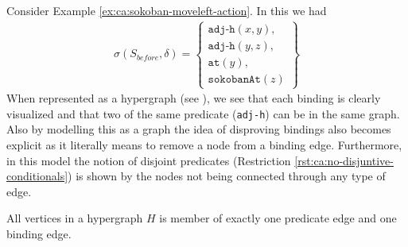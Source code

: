 \documentclass[../Master.tex]{subfiles}
\begin{document}
\begin{example}\label{ex:ca:sokoban-hypergraph}
	Consider Example \ref{ex:ca:sokoban-moveleft-action}. In this we had
	\begin{align*}
		\sigma(S_{before}, \delta) =
			\left\{
			\begin{gathered}
				\texttt{adj-h}(x, y), \\
				\texttt{adj-h}(y, z), \\
				\texttt{at}(y), \\
				\texttt{sokobanAt}(z)
			\end{gathered}
			\right\}
	\end{align*}
	When represented as a hypergraph (see ),
	we see that each binding is clearly visualized and that two of the same predicate (\texttt{adj-h}) can be in the same graph.
	Also by modelling this as a graph the idea of disproving bindings also
	becomes explicit as it literally means to remove a node from a binding edge.
	Furthermore, in this model the notion of disjoint predicates (Restriction \ref{rst:ca:no-disjuntive-conditionals}) is shown by the nodes not being connected through any type of edge.
\end{example}


\begin{proposition}
    All vertices in a hypergraph $H$ is member of exactly one predicate edge and one binding edge.
\end{proposition}
\end{document}
